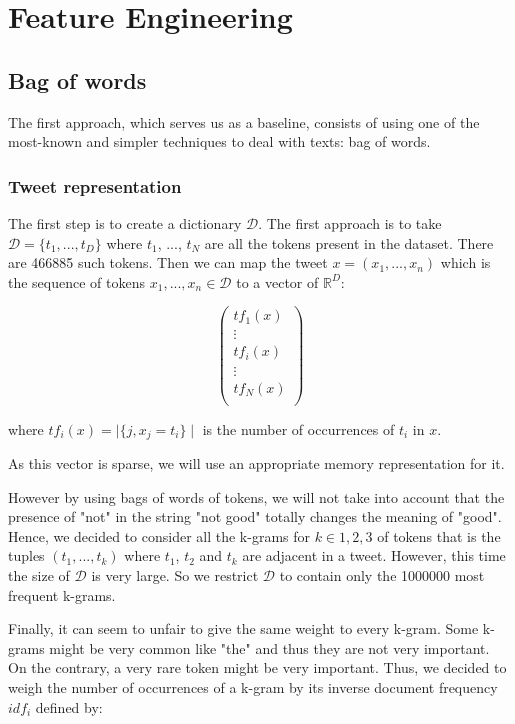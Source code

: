 \documentclass[10pt,conference,compsocconf]{IEEEtran}
\begin{document}
\section  {Feature Engineering}
\subsection{Bag of words}

The first approach, which serves us as a baseline, consists of using one of the most-known and simpler techniques to deal with texts: bag of words.

\subsubsection{Tweet representation}

The first step is to create a dictionary $\mathcal{D}$. The first approach is to take $\mathcal{D} = \{ t_1, ..., t_D \}$ where $t_1$, ..., $t_N$ are all the tokens present in the dataset. There are 466885 such tokens. Then we can map the tweet $x = (x_1, ..., x_n)$ which is the sequence of tokens $x_1, ..., x_n \in \mathcal{D}$ to a vector of $\mathbb{R}^D$:

$$
\left(
\begin{array}{c}
tf_1(x) \\
\vdots \\
tf_i(x) \\
\vdots \\
tf_N(x) \\
\end{array}
\right)
$$

where $tf_i(x) = \mid \{j, x_j = t_i \} \mid$ is the number of occurrences of $t_i$ in $x$.

As this vector is sparse, we will use an appropriate memory representation for it.

However by using bags of words of tokens, we will not take into account that the presence of "not" in the string "not good" totally changes the meaning of "good". Hence, we decided to consider all the k-grams for $k \in {1, 2, 3}$ of tokens that is the tuples $(t_1, ..., t_k)$ where $t_1$, $t_2$ and $t_k$ are adjacent in a tweet. However, this time the size of $\mathcal{D}$ is very large. So we restrict $\mathcal{D}$ to contain only the 1000000 most frequent k-grams.

Finally, it can seem to unfair to give the same weight to every k-gram. Some k-grams might be very common like "the" and thus they are not very important. On the contrary, a very rare token might be very important. Thus, we decided to weigh the number of occurrences of a k-gram by its inverse document frequency $idf_i$ defined by:
\end{document}
